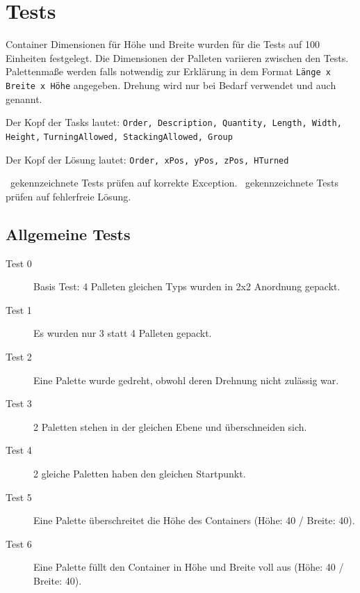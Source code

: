 \documentclass{scrartcl}
\newcommand{\cmark}{\ding{51}}%
\newcommand{\xmark}{\ding{55}}%
\begin{document}
\section*{Tests}

Container Dimensionen für Höhe und Breite wurden für die Tests auf 100 Einheiten festgelegt. Die Dimensionen der Palleten variieren zwischen den Tests. Palettenmaße werden falls notwendig zur Erklärung in dem Format \verb|Länge x Breite x Höhe| angegeben. Drehung wird nur bei Bedarf verwendet und auch genannt.

\noindent Der Kopf der Tasks lautet: \verb|Order, Description, Quantity, Length, Width, Height,| \verb|TurningAllowed, StackingAllowed, Group|


\noindent Der Kopf der Lösung lautet: \verb|Order, xPos, yPos, zPos, HTurned|

\xmark\ gekennzeichnete Tests prüfen auf korrekte Exception. \cmark\ gekennzeichnete Tests prüfen auf fehlerfreie Lösung.

\subsection*{Allgemeine Tests}

\begin{description}
	\item[Test 0 \cmark] Basis Test: 4 Palleten gleichen Typs wurden in 2x2 Anordnung gepackt.
	\item[Test 1 \xmark] Es wurden nur 3 statt 4 Palleten gepackt.
	\item[Test 2 \xmark] Eine Palette wurde gedreht, obwohl deren Drehnung nicht zulässig war.
	\item[Test 3 \xmark] 2 Paletten stehen in der gleichen Ebene und überschneiden sich.
	\item[Test 4 \xmark] 2 gleiche Paletten haben den gleichen Startpunkt.
	\item[Test 5 \xmark] Eine Palette überschreitet die Höhe des Containers (Höhe: 40 / Breite: 40).
	\item[Test 6 \cmark] Eine Palette füllt den Container in Höhe und Breite voll aus (Höhe: 40 / Breite: 40).
\end{description}
\end{document}
